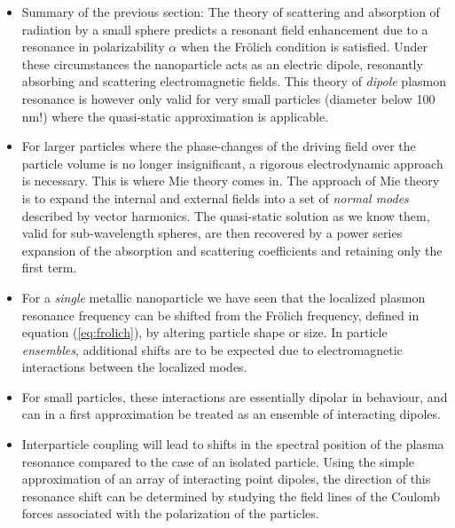 \begin{itemize}
    \item Summary of the previous section: The theory of scattering and absorption of radiation by a small sphere predicts a resonant field enhancement due to a resonance in polarizability $\alpha$ when the Frölich condition is satisfied. Under these circumstances the nanoparticle acts as an electric dipole, resonantly absorbing and scattering electromagnetic fields. This theory of \emph{dipole} plasmon resonance is however only valid for very small particles (diameter below 100 nm!) where the quasi-static approximation is applicable.
    
    \item For larger particles where the phase-changes of the driving field over the particle volume is no longer insignificant, a rigorous electrodynamic approach is necessary. This is where Mie theory comes in. The approach of Mie theory is to expand the internal and external fields into a set of \emph{normal modes} described by vector harmonics. The quasi-static solution as we know them, valid for sub-wavelength spheres, are then recovered by a power series expansion of the absorption and scattering coefficients and retaining only the first term.
\end{itemize}


\begin{itemize}
    \item For a \emph{single} metallic nanoparticle we have seen that the localized plasmon resonance frequency can be shifted from the Frölich frequency, defined in equation (\ref{eq:frolich}), by altering particle shape or size. In particle \emph{ensembles}, additional shifts are to be expected due to electromagnetic interactions between the localized modes.
    
    \item For small particles, these interactions are essentially dipolar in behaviour, and can in a first approximation be treated as an ensemble of interacting dipoles.
    
    \item Interparticle coupling will lead to shifts in the spectral position of the plasma resonance compared to the case of an isolated particle. Using the simple approximation of an array of interacting point dipoles, the direction of this resonance shift can be determined by studying the field lines of the Coulomb forces associated with the polarization of the particles.
\end{itemize}

